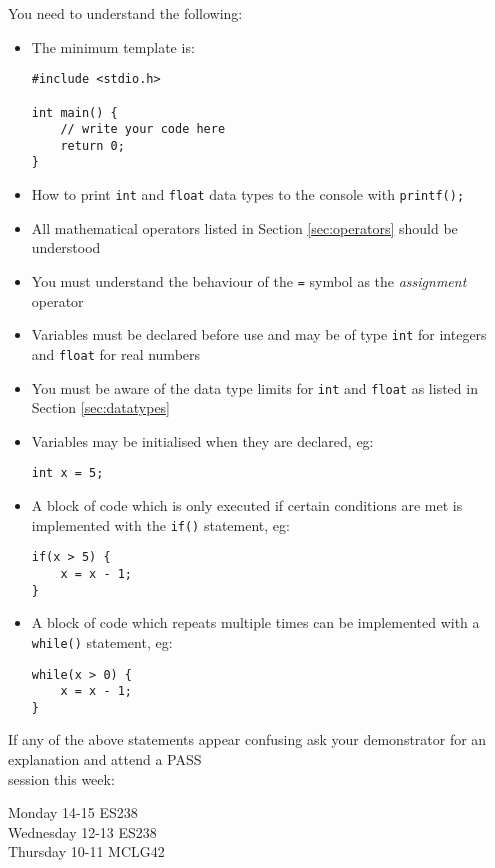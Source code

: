 \documentclass{lab}
\begin{document}
You need to understand the following:

\begin{itemize}
\item The minimum template is:
\begin{lstlisting}[style=CStyle]
#include <stdio.h>

int main() {
	// write your code here
	return 0;
}
\end{lstlisting}
\item How to print \texttt{int} and \texttt{float} data types to the console with \texttt{printf();}
\item All mathematical operators listed in Section \ref{sec:operators} should be understood
\item You must understand the behaviour of the \texttt{=} symbol as the \textit{assignment} operator
\item Variables must be declared before use and may be of type \texttt{int} for integers and \texttt{float} for real numbers
\item You must be aware of the data type limits for \texttt{int} and \texttt{float} as listed in Section \ref{sec:datatypes}
\item Variables may be initialised when they are declared, eg:
\begin{lstlisting}[style=CStyle]
int x = 5;
\end{lstlisting}
\item A block of code which is only executed if certain conditions are met is implemented with the \texttt{if()} statement, eg:
\begin{lstlisting}[style=CStyle]
if(x > 5) {
	x = x - 1;
}
\end{lstlisting}
\item A block of code which repeats multiple times can be implemented with a \texttt{while()} statement, eg:
\begin{lstlisting}[style=CStyle]
while(x > 0) {
	x = x - 1;
}
\end{lstlisting}

\end{itemize}

{\huge If any of the above statements appear confusing ask your demonstrator for an explanation and attend a PASS\\session this week: \\
\begin{center}
Monday 14-15 ES238 \\
Wednesday 12-13 ES238\\
Thursday 10-11 MCLG42
\end{center}}
\end{document}
